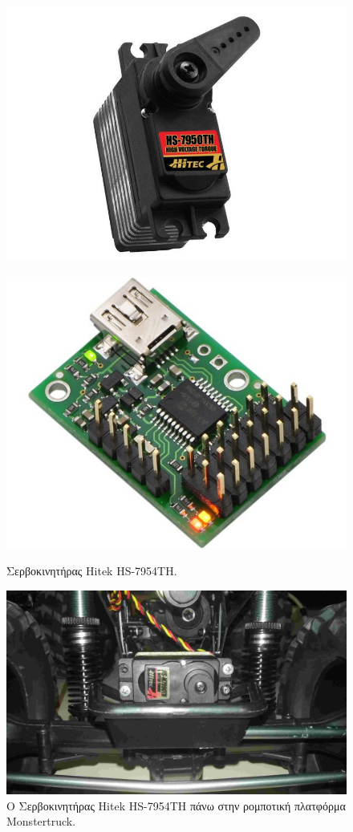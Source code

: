 \begin{figure}[!ht]
	\begin{minipage}[t]{.49\textwidth}		
		\centering
		\includegraphics[width=0.5\linewidth]{Chapters/Chapter2/Figures/hitek_servo.jpg}
		\caption{Σερβοκινητήρας Hitek HS-7954TH.}
		\label{fig:hitek_servo}
	\end{minipage}
	\begin{minipage}[t]{.5\textwidth}
 	\centering
		\includegraphics[width=0.5\linewidth]{Chapters/Chapter2/Figures/pololu_maestro.jpg}
		\label{fig:pololu_maestro}
	\end{minipage}
\end{figure}

\begin{figure}[!ht]
		\centering
		\includegraphics[width=0.5\linewidth]{Chapters/Chapter2/Figures/steering_servo.jpg}
		\caption{O Σερβοκινητήρας Hitek HS-7954TH πάνω στην ρομποτική πλατφόρμα Monstertruck.}
		\label{fig:servo_steering}
\end{figure}

